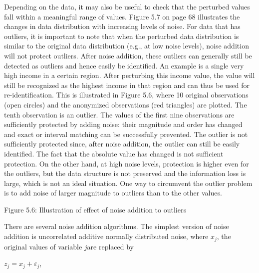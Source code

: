 \documentclass[letterpaper,10pt,english]{sphinxmanual}
\begin{document}
Depending on the data, it may also be useful to check that the perturbed
values fall within a meaningful range of values. Figure 5.7 on page 68
illustrates the changes in data distribution with increasing levels of
noise. For data that has outliers, it is important to note that when the
perturbed data distribution is similar to the original data distribution
(e.g., at low noise levels), noise addition will not protect outliers.
After noise addition, these outliers can generally still be detected as
outliers and hence easily be identified. An example is a single very
high income in a certain region. After perturbing this income value, the
value will still be recognized as the highest income in that region and
can thus be used for re-identification. This is illustrated in Figure
5.6, where 10 original observations (open circles) and the anonymized
observations (red triangles) are plotted. The tenth observation is an
outlier. The values of the first nine observations are sufficiently
protected by adding noise: their magnitude and order has changed and
exact or interval matching can be successfully prevented. The outlier is
not sufficiently protected since, after noise addition, the outlier can
still be easily identified. The fact that the absolute value has changed
is not sufficient protection. On the other hand, at high noise levels,
protection is higher even for the outliers, but the data structure is
not preserved and the information loss is large, which is not an ideal
situation. One way to circumvent the outlier problem is to add noise of
larger magnitude to outliers than to the other values.

\noindent{}

Figure 5.6: Illustration of effect of noise addition to outliers

There are several noise addition algorithms. The simplest version of
noise addition is uncorrelated additive normally distributed noise,
where \(x_{j}\), the original values of variable
\(j\)are replaced by

\(z_{j} = x_{j} + \varepsilon_{j}\),
\end{document}
